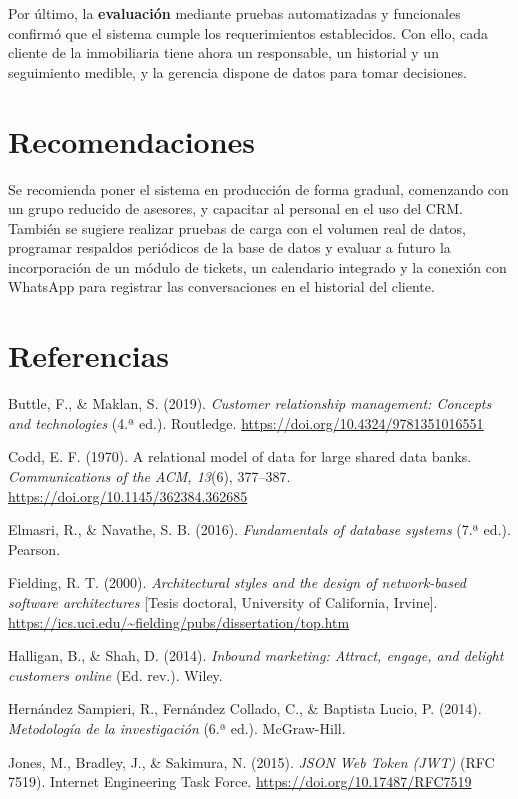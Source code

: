 \documentclass[stu,12pt,letterpaper,donotrepeattitle,floatsintext]{apa7}
\begin{document}
Por último, la \textbf{evaluación} mediante pruebas automatizadas y funcionales confirmó que el sistema cumple los requerimientos establecidos. Con ello, cada cliente de la inmobiliaria tiene ahora un responsable, un historial y un seguimiento medible, y la gerencia dispone de datos para tomar decisiones.

\section{Recomendaciones}

Se recomienda poner el sistema en producción de forma gradual, comenzando con un grupo reducido de asesores, y capacitar al personal en el uso del CRM. También se sugiere realizar pruebas de carga con el volumen real de datos, programar respaldos periódicos de la base de datos y evaluar a futuro la incorporación de un módulo de tickets, un calendario integrado y la conexión con WhatsApp para registrar las conversaciones en el historial del cliente.

\newpage
\section{Referencias}

\begingroup
\setlength{\parindent}{-0.5in}
\setlength{\leftskip}{0.5in}

Buttle, F., \& Maklan, S. (2019). \textit{Customer relationship management: Concepts and technologies} (4.ª ed.). Routledge. \url{https://doi.org/10.4324/9781351016551}

Codd, E. F. (1970). A relational model of data for large shared data banks. \textit{Communications of the ACM, 13}(6), 377–387. \url{https://doi.org/10.1145/362384.362685}

Elmasri, R., \& Navathe, S. B. (2016). \textit{Fundamentals of database systems} (7.ª ed.). Pearson.

Fielding, R. T. (2000). \textit{Architectural styles and the design of network-based software architectures} [Tesis doctoral, University of California, Irvine]. \url{https://ics.uci.edu/~fielding/pubs/dissertation/top.htm}

Halligan, B., \& Shah, D. (2014). \textit{Inbound marketing: Attract, engage, and delight customers online} (Ed. rev.). Wiley.

Hernández Sampieri, R., Fernández Collado, C., \& Baptista Lucio, P. (2014). \textit{Metodología de la investigación} (6.ª ed.). McGraw-Hill.

Jones, M., Bradley, J., \& Sakimura, N. (2015). \textit{JSON Web Token (JWT)} (RFC 7519). Internet Engineering Task Force. \url{https://doi.org/10.17487/RFC7519}
\end{document}
